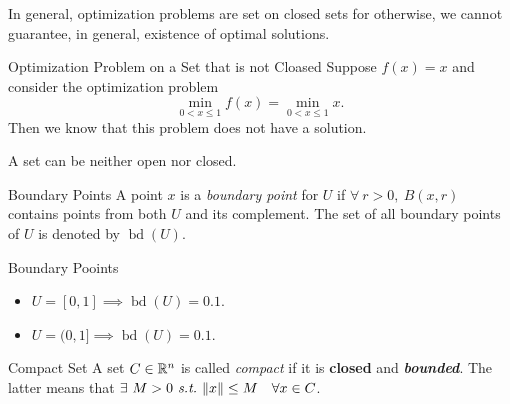 \begin{rmk}
	In general, optimization problems are set on closed sets for otherwise, we cannot guarantee, in general, existence of optimal solutions. 	
\end{rmk}
\begin{eg}{Optimization Problem on a Set that is not Cloased}
	Suppose $f(x)=x$ and consider the optimization problem \[\min_{0<x\leq1}f(x)=\min_{0<x\leq1}x.\] Then we know that this problem does not have a solution.
\end{eg}
\begin{rmk}
	A set can be neither open nor closed.	
\end{rmk}
\begin{df}{Boundary Points}
	A point $x$ is a \textit{boundary point} for $U$ if $\forall\ r>0,\ B(x,r)$ contains points from both $U$ and its complement. The set of all boundary points of $U$ is denoted by $\operatorname{bd}(U)$.
\end{df}
\begin{eg}{Boundary Pooints}
	\begin{itemize}
		\item $U=[0,1]\implies\operatorname{bd}(U)=\qty{0,1}$.
		\item $U=(0,1]\implies\operatorname{bd}(U)=\qty{0,1}$.
	\end{itemize}	
\end{eg}
\begin{df}{Compact Set}
	A set $C\in{\mathbb{R}}^n$ is called \textit{compact} if it is \textbf{closed} and \textbf{\textit{bounded}}. The latter means that $\exists\ M>0\emph{\ s.t.\ }\|x\|\leq M\quad\forall x\in C$.	
\end{df}

